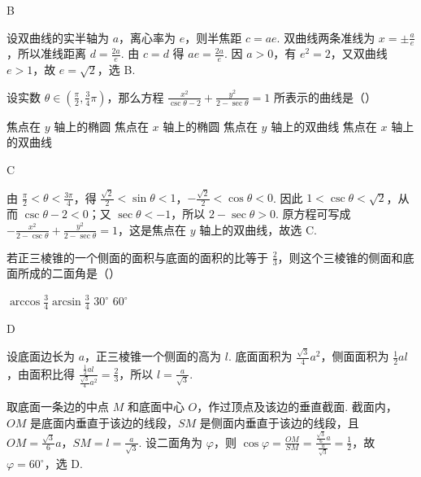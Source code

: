 \documentclass[UTF8,a4paper,oneside,11pt]{ctexbook}
\begin{document}
\begin{answer}
B
\end{answer}

\begin{solution}
设双曲线的实半轴为 \(a\)，离心率为 \(e\)，则半焦距 \(c=ae\). 双曲线两条准线为 \(x=\pm\frac{a}{e}\)，所以准线距离
\(d=\frac{2a}{e}\). 由 \(c=d\) 得 \(ae=\frac{2a}{e}\). 因 \(a>0\)，有 \(e^{2}=2\)，又双曲线 \(e>1\)，故 \(e=\sqrt{2}\)，选 B.
\end{solution}

\begin{problem}

设实数 \(\theta \in \left(\frac{\pi}{2}, \frac{3}{4}\pi\right)\)，那么方程 \(\frac{x^2}{\csc \theta - 2} + \frac{y^2}{2 - \sec \theta} = 1 \) 所表示的曲线是（\quad）

\choices
{焦点在 \(y\) 轴上的椭圆}
{焦点在 \(x\) 轴上的椭圆}
{焦点在 \(y\) 轴上的双曲线}
{焦点在 \(x\) 轴上的双曲线}
\end{problem}

\begin{answer}
C
\end{answer}

\begin{solution}
由 \(\frac{\pi}{2}<\theta<\frac{3\pi}{4}\)，得
\(\frac{\sqrt{2}}{2}<\sin\theta<1\)，\(-\frac{\sqrt{2}}{2}<\cos\theta<0\). 因此
\(1<\csc\theta<\sqrt{2}\)，从而 \(\csc\theta-2<0\)；又 \(\sec\theta< -1\)，所以 \(2-\sec\theta>0\). 原方程可写成
\(-\frac{x^{2}}{2-\csc\theta}+\frac{y^{2}}{2-\sec\theta}=1\)，这是焦点在 \(y\) 轴上的双曲线，故选 C.
\end{solution}

\begin{problem}

若正三棱锥的一个侧面的面积与底面的面积的比等于 \(\frac{2}{3} \)，则这个三棱锥的侧面和底面所成的二面角是（\quad）

\choices
{\(\arccos\frac{3}{4} \)}{\(\arcsin\frac{3}
{4} \)}
{\(30^{\circ} \)}
{\(60^{\circ} \)}
\end{problem}

\begin{answer}
D
\end{answer}

\begin{solution}
设底面边长为 \(a\)，正三棱锥一个侧面的高为 \(l\). 底面面积为 \(\frac{\sqrt{3}}{4}a^{2}\)，侧面面积为 \(\frac{1}{2}al\)，由面积比得
\(\frac{\frac{1}{2}al}{\frac{\sqrt{3}}{4}a^{2}}=\frac{2}{3}\)，所以 \(l=\frac{a}{\sqrt{3}}\).

取底面一条边的中点 \(M\) 和底面中心 \(O\)，作过顶点及该边的垂直截面. 截面内，\(OM\) 是底面内垂直于该边的线段，\(SM\) 是侧面内垂直于该边的线段，且 \(OM=\frac{\sqrt{3}}{6}a\)，\(SM=l=\frac{a}{\sqrt{3}}\). 设二面角为 \(\varphi\)，则
\(\cos\varphi=\frac{OM}{SM}=\frac{\frac{\sqrt{3}}{6}a}{\frac{a}{\sqrt{3}}}=\frac{1}{2}\)，故 \(\varphi=60^\circ\)，选 D.
\end{solution}
\end{document}
